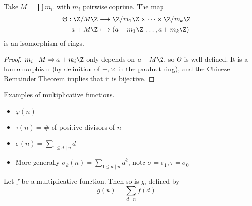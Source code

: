 \documentclass{article}
\begin{document}
\begin{nthm}
    Take $M = \prod m_i$, with $ m_i$ pairwise coprime.
    The map
    \begin{align*}
        \Theta : \Z/M\Z &\longrightarrow \Z/m_1\Z \times \cdots \times \Z / m_k \Z \\
                       a + M \Z &\longmapsto (a + m_1 \Z, \dotsc , a + m_k \Z )
    \end{align*}
    is an isomorphism of rings.
\end{nthm}

\begin{proof}
    $m_i \mid M \Rightarrow a+m_i \Z$ only depends on $a + M\Z$, so $\Theta$ is well-defined.
    It is a homomorphism (by definition of $+, \times$ in the product ring), and the \hyperlink{thm:crt}{Chinese Remainder Theorem} implies that it is bijective.
\end{proof}


\begin{eg}
    Examples of \hyperlink{def:multiplicativeFunction}{multiplicative functions}.
    \begin{itemize}
        \item $\varphi(n)$
        \item $\tau (n) = \#$ of positive divisors of  $n$
        \item $\sigma (n) = \sum_{1 \leq d \mid n} d$
        \item More generally $\sigma_k (n) = \sum_{1 \leq d \mid n} d^k$, note $\sigma = \sigma_1, \tau = \sigma_0$
    \end{itemize}
\end{eg}

\begin{nlemma}\label{lem:2.4}
    Let $f$ be a multiplicative function. Then so is $g$, defined by \begin{equation*} g(n) = \sum_{d \mid n} f(d) \end{equation*}
\end{nlemma}
\end{document}
